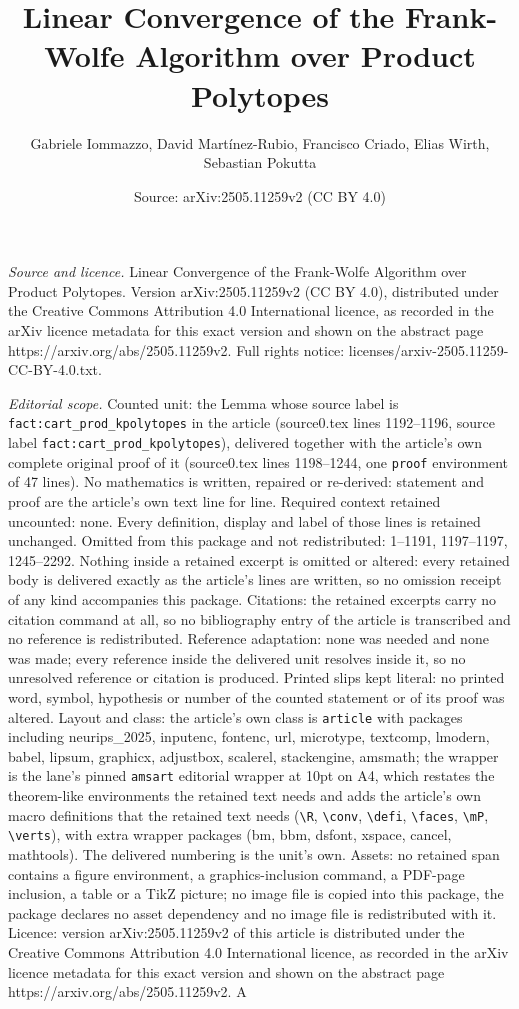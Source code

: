 \documentclass[10pt,a4paper]{amsart}
\title[Linear Convergence of the Frank-Wolfe Algorithm over Product]{Linear Convergence of the Frank-Wolfe Algorithm over Product Polytopes}
\author{Gabriele Iommazzo, David Mart\'inez-Rubio, Francisco Criado, Elias Wirth, Sebastian Pokutta}
\date{Source: arXiv:2505.11259v2 (CC BY 4.0)}
\begin{document}
\maketitle

\noindent\emph{Source and licence.} Linear Convergence of the Frank-Wolfe Algorithm over Product Polytopes. Version arXiv:2505.11259v2 (CC BY 4.0), distributed under the Creative Commons Attribution 4.0 International licence, as recorded in the arXiv licence metadata for this exact version and shown on the abstract page https://arxiv.org/abs/2505.11259v2. Full rights notice: licenses/arxiv-2505.11259-CC-BY-4.0.txt.\par\smallskip

\noindent\textit{Editorial scope.} Counted unit: the Lemma whose source label is \texttt{fact:cart\_prod\_kpolytopes} in the article (source0.tex lines 1192--1196, source label \texttt{fact:cart\_prod\_kpolytopes}), delivered together with the article's own complete original proof of it (source0.tex lines 1198--1244, one \texttt{proof} environment of 47 lines). No mathematics is written, repaired or re-derived: statement and proof are the article's own text line for line. Required context retained uncounted: none. Every definition, display and label of those lines is retained unchanged. Omitted from this package and not redistributed: 1--1191, 1197--1197, 1245--2292. Nothing inside a retained excerpt is omitted or altered: every retained body is delivered exactly as the article's lines are written, so no omission receipt of any kind accompanies this package. Citations: the retained excerpts carry no citation command at all, so no bibliography entry of the article is transcribed and no reference is redistributed. Reference adaptation: none was needed and none was made; every reference inside the delivered unit resolves inside it, so no unresolved reference or citation is produced. Printed slips kept literal: no printed word, symbol, hypothesis or number of the counted statement or of its proof was altered. Layout and class: the article's own class is \texttt{article} with packages including neurips\_2025, inputenc, fontenc, url, microtype, textcomp, lmodern, babel, lipsum, graphicx, adjustbox, scalerel, stackengine, amsmath; the wrapper is the lane's pinned \texttt{amsart} editorial wrapper at 10pt on A4, which restates the theorem-like environments the retained text needs and adds the article's own macro definitions that the retained text needs (\texttt{\textbackslash R}, \texttt{\textbackslash conv}, \texttt{\textbackslash defi}, \texttt{\textbackslash faces}, \texttt{\textbackslash mP}, \texttt{\textbackslash verts}), with extra wrapper packages (bm, bbm, dsfont, xspace, cancel, mathtools). The delivered numbering is the unit's own. Assets: no retained span contains a figure environment, a graphics-inclusion command, a PDF-page inclusion, a table or a TikZ picture; no image file is copied into this package, the package declares no asset dependency and no image file is redistributed with it. Licence: version arXiv:2505.11259v2 of this article is distributed under the Creative Commons Attribution 4.0 International licence, as recorded in the arXiv licence metadata for this exact version and shown on the abstract page https://arxiv.org/abs/2505.11259v2. A 
\end{document}
